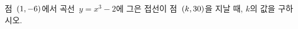점~$(1{,}\mkern3mu\mathopen{}-6)$에서 곡선~$y=x^3-2$에 그은 접선이 점~$(k{,}\mkern3mu\mathopen{}30)$을 지날 때, $k$의 값을 구하시오.
